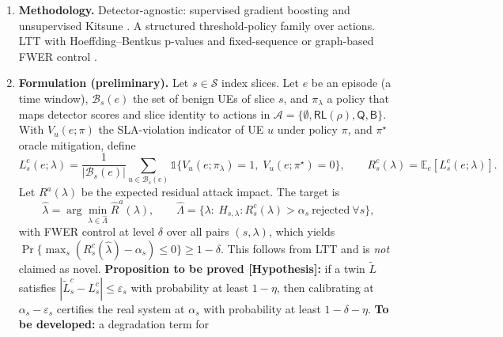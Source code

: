 \begin{enumerate}
  \begin{itemize}
  \tightlist
  \item
    \textbf{(a)} The formulation: oracle-counterfactual collateral risk
    per slice.
  \item
    \textbf{(b)} Twin-in-the-loop LTT calibration with surrogate-error
    propagation.
  \item
    \textbf{(c)} A dependence- and shift-aware extension with a
    monitored recalibration trigger.
  \item
    \textbf{(d)} An open, reproducible sliced-core mitigation testbed
    and benchmark protocol.
  \end{itemize}
\item
  \textbf{Methodology.} Detector-agnostic: supervised gradient boosting
  and unsupervised Kitsune \citep{mirsky2018kitsune}. A structured
  threshold-policy family over actions. LTT with Hoeffding--Bentkus
  p-values and fixed-sequence or graph-based FWER control
  \citep{angelopoulos2025ltt}.
\item
  \textbf{Formulation (preliminary).} Let \(s\in\mathcal{S}\) index
  slices. Let \(e\) be an episode (a time window), \(\mathcal{B}_s(e)\)
  the set of benign UEs of slice \(s\), and \(\pi_\lambda\) a policy
  that maps detector scores and slice identity to actions in
  \(\mathcal{A}=\{\emptyset,\mathsf{RL}(\rho),\mathsf{Q},\mathsf{B}\}\).
  With \(V_u(e;\pi)\) the SLA-violation indicator of UE \(u\) under
  policy \(\pi\), and \(\pi^\star\) oracle mitigation, define
  \[L^{c}_s(e;\lambda)=\frac{1}{|\mathcal{B}_s(e)|}\sum_{u\in\mathcal{B}_s(e)}\mathbb{1}\{V_u(e;\pi_\lambda)=1,\;V_u(e;\pi^\star)=0\},\qquad R^{c}_s(\lambda)=\mathbb{E}_e[L^{c}_s(e;\lambda)].\]
  Let \(R^{a}(\lambda)\) be the expected residual attack impact. The
  target is
  \[\hat{\lambda}=\arg\min_{\lambda\in\hat{\Lambda}}\hat{R}^{a}(\lambda),\qquad \hat{\Lambda}=\{\lambda:\ H_{s,\lambda}:R^c_s(\lambda)>\alpha_s\ \mathrm{rejected}\ \forall s\},\]
  with FWER control at level \(\delta\) over all pairs \((s,\lambda)\),
  which yields
  \(\Pr\{\max_s(R^c_s(\hat{\lambda})-\alpha_s)\le 0\}\ge 1-\delta\).
  This follows from LTT \citep{angelopoulos2025ltt} and is \emph{not}
  claimed as novel. \textbf{Proposition to be proved {[}Hypothesis{]}:}
  if a twin \(\tilde{L}\) satisfies
  \(|\tilde{L}^c_s-L^c_s|\le\varepsilon_s\) with probability at least
  \(1-\eta\), then calibrating at \(\alpha_s-\varepsilon_s\) certifies
  the real system at \(\alpha_s\) with probability at least
  \(1-\delta-\eta\). \textbf{To be developed:} a degradation term for

\end{enumerate}
